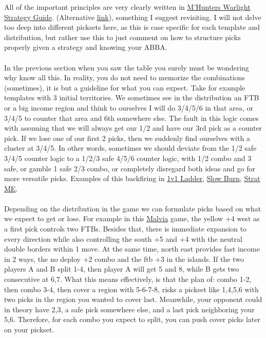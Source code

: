 All of the important principles are very clearly written in \href{http://nghood.com/pages/warzone/strategyguide}{M'Hunters Warlight Strategy Guide}. (Alternative \href{https://warlight.nghood.com/index.html}{link}), something I suggest revisiting. I will not delve too deep into different picksets here, as this is case specific for each template and distribution, but rather use this to just comment on how to structure picks properly given a strategy and knowing your ABBA.
\\
\\
In the previous section when you saw the table you surely must be wondering why know all this. In reality, you do not need to memorize the combinations (sometimes), it is but a guideline for what you can expect. Take for example templates with 3 initial territories. We sometimes see in the distribution an FTB or a big income region and think to ourselves I will do 3/4/5/6 in that area, or 3/4/5 to counter that area and 6th somewhere else. The fault in this logic comes with assuming that we will always get our 1/2 and have our 3rd pick as a counter pick. If we lose one of our first 2 picks, then we suddenly find ourselves with a cluster at 3/4/5. In other words, sometimes we should deviate from the 1/2 safe 3/4/5 counter logic to a 1/2/3 safe 4/5/6 counter logic, with 1/2 combo and 3 safe, or gamble 1 safe 2/3 combo, or completely disregard both ideas and go for more versatile picks. Examples of this backfiring in \href{https://www.warzone.com/MultiPlayer?GameID=39323183}{1v1 Ladder}, \href{https://www.warzone.com/MultiPlayer?GameID=40124025}{Slow Burn}, \href{https://www.warzone.com/MultiPlayer?GameID=15035176}{Strat ME}. 
\\
\\
Depending on the distribution in the game we can formulate picks based on what we expect to get or lose. For example in this \href{https://www.warzone.com/MultiPlayer?GameID=40132924}{Malvia} game, the yellow +4 west as a first pick controls two FTBs. Besides that, there is immediate expansion to every direction while also controlling the south +5 and +4 with the neutral double borders within 1 move. At the same time, north east provides fast income in 2 ways, the no deploy +2 combo and the ftb +3 in the islands. If the two players A and B split 1-4, then player A will get 5 and 8, while B gets two consecutive at 6,7. What this means effectively, is that the plan of: combo 1-2, then combo 3-4, then cover a region with 5-6-7-8, risks a pickset like 1,4,5,6 with two picks in the region you wanted to cover last. Meanwhile, your opponent could in theory have 2,3, a safe pick somewhere else, and a last pick neighboring your 5,6. Therefore, for each combo you expect to split, you can push cover picks later on your pickset.
